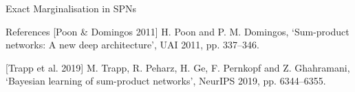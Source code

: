 \documentclass{beamer}
\begin{document}
\begin{frame}{Exact Marginalisation in SPNs}
{
}

\end{frame}

\begin{frame}{References}
\scriptsize [Poon \& Domingos 2011] H. Poon and P. M. Domingos, ‘Sum-product networks: A new deep architecture’, UAI 2011, pp. 337–346.

\scriptsize [Trapp et al. 2019] M. Trapp, R. Peharz, H. Ge, F. Pernkopf and Z. Ghahramani, ‘Bayesian learning of sum-product networks’, NeurIPS 2019, pp. 6344–6355.
\end{frame}
\end{document}
